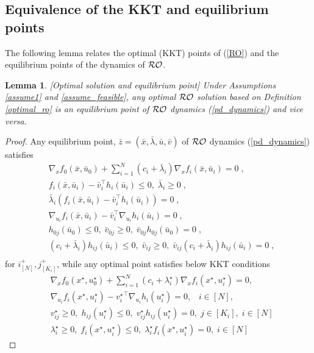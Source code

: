 \documentclass[journal,twoside,web]{ieeecolor}
\newtheorem{lemma}{Lemma}
\begin{document}
\subsection{Equivalence of the KKT and equilibrium points} \label{kkt<=>eq.sec}
 The following lemma relates the optimal (KKT) points of (\ref{RO}) and the equilibrium points of the dynamics of ${\cal RO}$.
\begin{lemma}\label{kkttoeq.lem}[Optimal solution and equilibrium point]
Under Assumptions \ref{assume1} and \ref{assume_feasible}, any optimal ${\cal RO}$ solution based on Definition \ref{optimal_ro} is an equilibrium point of ${\cal RO}$ dynamics (\ref{pd_dynamics}) and vice versa.
\end{lemma}
\begin{proof}
Any equilibrium point, $\bar{z}=(\bar{x},\bar{\lambda},\bar{u},\bar{v})$  of ${\cal RO}$ dynamics (\ref{pd_dynamics}) satisfies
\begin{align*}
&\nabla_x f_0(\bar x,\bar{u}_0)+  \sum_{i=1}^N (c_i+\bar \lambda_i) \nabla_x f_i(\bar x,\bar u_i)=0\;,\\
&f_{i}(\bar x,\bar u_i)-\bar v_i^\top h_i(\bar u_i)\leq 0,\;\bar \lambda_i\geq 0\;,\\
&\bar \lambda_i(f_{i}(\bar x,\bar u_i)-\bar v_i^\top h_i(\bar u_i))=0\;,\\
&\nabla_{u_i} f_i(\bar x,\bar u_i)-\bar v_i^\top \nabla_{u_i} h_i(\bar u_i)=0\;,\\
&h_{0j}(\bar u_0)\leq 0,\; \bar v_{0j}\geq 0,\;\bar v_{0j}h_{0j}(\bar u_0)=0\;,\\
& (c_i+\bar{\lambda}_i) h_{ij}(\bar u_i)\leq 0,\; \bar v_{ij}\geq 0,\;\bar v_{ij}(c_i+\bar \lambda_i) h_{ij}(\bar u_i)=0\;,\\
\end{align*}
for $i^+_{[N]},j^+_{[K_i]}$, while any optimal point satisfies below KKT conditions 
\begin{align}
    &\nabla_x f_0(x^\star,u_0^\star)+  \sum_{i=1}^N(c_i+\lambda^\star_i) \nabla_x f_i(x^\star,u_i^\star)=0, \label{kkt1} \\
    &\nabla_{u_i} f_i(x^\star,u_i^\star)-{v_i^\star}^\top \nabla_{u_i} h_i(u_i^\star)=0, \;\;\; i \in [N], \label{kkt2} \\
    &v_{ij}^\star\geq 0,\; h_{ij}(u_i^\star)\leq 0,\;v_{ij}^\star h_{ij}(u_i^\star)=0, \; j \in [K_i], \; i \in [N] \label{kkt3} \\
    &\lambda_i^\star\geq 0,\;f_{i}(x^\star,u_i^\star)\leq 0,\;\lambda_i^\star f_{i}(x^\star,u_i^\star)=0, \; i \in [N] \label{kkt4}
\end{align}


\end{proof}
\end{document}
